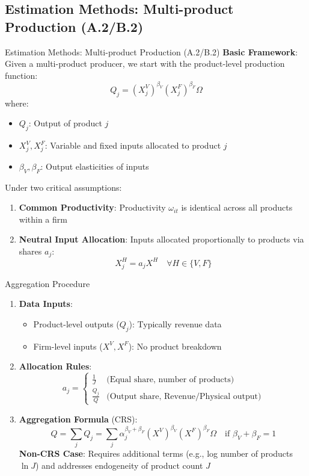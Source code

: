 \documentclass[aspectratio=169]{beamer}  %
\begin{document}
\subsection{Estimation Methods: Multi-product Production (A.2/B.2)}
\begin{frame}{Estimation Methods: Multi-product Production (A.2/B.2)}
\textbf{Basic Framework}:
Given a multi-product producer, we start with the product-level production function:
\begin{equation*}
Q_j = \left(X^V_j\right)^{\beta_V} \left(X^F_j\right)^{\beta_F}\Omega
\end{equation*}
where:
\begin{itemize}
    \item \( Q_j \): Output of product \( j \)
    \item \( X^V_j, X^F_j \): Variable and fixed inputs allocated to product \( j \)
    \item \( \beta_V, \beta_F \): Output elasticities of inputs
\end{itemize}
Under two critical assumptions:
\begin{enumerate}
    \item \textbf{Common Productivity}: Productivity \( \omega_{it} \) is identical across all products within a firm
    \item \textbf{Neutral Input Allocation}: Inputs allocated proportionally to products via shares \( a_j \):
    \[
    X^H_j = a_j X^H \quad \forall H \in \{V,F\}
    \]
\end{enumerate}
\end{frame}


\begin{frame}{Aggregation Procedure  }
\begin{enumerate}
    \item \textbf{Data Inputs}:
    \begin{itemize}
        \item Product-level outputs ($Q_j$): Typically revenue data
        \item Firm-level inputs ($X^V, X^F$): No product breakdown
    \end{itemize}
    
    \item \textbf{Allocation Rules}:
    \[
    a_j = \begin{cases}
        \frac{1}{J} & \text{(Equal share, number of products)} \\
        \frac{Q_{j}}{Q} & \text{(Output share, Revenue/Physical output)}
    \end{cases}
    \]
    
    \item \textbf{Aggregation Formula} (CRS):
    \[
    Q = \sum_j Q_j =\sum_{j}\alpha_{j}^{\beta_{V}+\beta_{F}} (X^V)^{\beta_{V}} (X^F)^{\beta_{F}}\Omega \quad \text{if } \beta_V + \beta_F = 1
    \]
 \textbf{Non-CRS Case}: 
        Requires additional terms (e.g., log number of products \( \ln J \)) and addresses endogeneity of product count \( J \)
\end{enumerate}
\end{frame}
\end{document}
